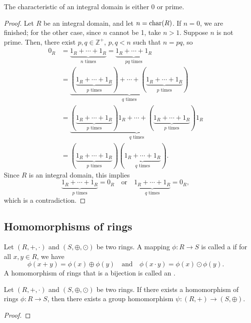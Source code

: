 \begin{prop}
The characteristic of an integral domain is either $ 0 $ or prime.
\end{prop}
\begin{proof}
Let $ R $ be an integral domain, and let $ n=\operatorname{char}(R) $. If $ n=0 $, we are finished; for the other case, since $ n $ cannot be 1, take $ n>1 $. Suppose $ n $ is not prime. Then, there exist $ p,q\in\mathbb{Z}^+ $, $ p,q<n $ such that $ n=pq $, so
\begin{align*}
    0_R &= \underbrace{1_R+\cdots+1_R}_{n\text{ times}}=\underbrace{1_R+\cdots+1_R}_{pq\text{ times}} \\
    &= \underbrace{(\underbrace{1_R+\cdots+1_R}_{p\text{ times}})+\cdots+(\underbrace{1_R+\cdots+1_R}_{p\text{ times}})}_{q\text{ times}} \\
    &= \underbrace{(\underbrace{1_R+\cdots+1_R}_{p\text{ times}})1_R+\cdots+(\underbrace{1_R+\cdots+1_R}_{p\text{ times}})1_R}_{q\text{ times}} \\
    &= (\underbrace{1_R+\cdots+1_R}_{p\text{ times}})(\underbrace{1_R+\cdots+1_R}_{q\text{ times}}).
\end{align*}
Since $ R $ is an integral domain, this implies
\begin{equation*}
    \underbrace{1_R+\cdots+1_R}_{p\text{ times}}=0_R \quad\text{or}\quad \underbrace{1_R+\cdots+1_R}_{q\text{ times}}=0_R,
\end{equation*}
which is a contradiction.
\end{proof}

\subsection*{Homomorphisms of rings}

\begin{defn}
Let $ (R,+,\cdot) $ and $ (S,\oplus,\odot) $ be two rings. A mapping $ \phi:R\to S $ is called a  if for all $ x,y\in R $, we have
\begin{equation*}
    \phi(x+y)=\phi(x)\oplus\phi(y) \quad\text{and}\quad \phi(x\cdot y)=\phi(x)\odot\phi(y).
\end{equation*}
A homomorphism of rings that is a bijection is called an .
\end{defn}

\begin{prop}\label{prop:underlying_morphism}
Let $ (R,+,\cdot) $ and $ (S,\oplus,\odot) $ be two rings. If there exists a homomorphism of rings $ \phi:R\to S $, then there exists a group homomorphism $ \psi:(R,+)\to(S,\oplus) $.
\end{prop}
\begin{proof}
\end{proof}

